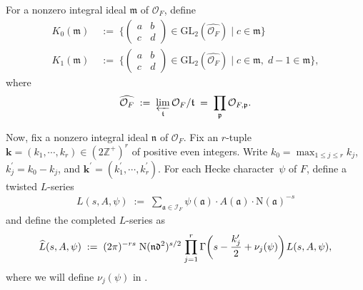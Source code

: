 \documentclass[11pt]{amsart}
\theoremstyle{remark}
\newcommand\m[1]{\begin{pmatrix}#1\end{pmatrix}}
\newcommand\mbf[1]{\mathbf{#1}}
\newcommand\cl[1]{\mathcal{#1}}
\newcommand\fr[1]{\mathfrak{#1}}
\newcommand\wh[1]{\widehat{#1}}
\newcommand{\inte}{\mathbb{Z}}
\newcommand{\clo}{\mathcal{O}}
\newcommand{\eq}{\;=\;}
\newcommand{\deq}{\;:=\;}
\def\thin{{\hskip 1pt}}
\newcommand{\N}{\mathrm{N}}
\newcommand{\GL}{\mathrm{GL}}
\begin{document}
For a nonzero integral ideal $\fr{m}$ of $\clo_F$, define
\begin{align*}
    K_0(\fr{m})&\deq\bigg\{\m{a&b\\c&d}\in\GL_2(\wh{\clo_F})\;\bigg|\;c\in\fr{m}\bigg\} \\
    K_1(\fr{m})&\deq\bigg\{\m{a&b\\c&d}\in\GL_2(\wh{\clo_F})\;\bigg|\;c\in\fr{m},\;d-1\in\fr{m}\bigg\},
\end{align*}
where
\begin{align*}
    \wh{\clo_F}\deq\varprojlim_{\fr{t}}\clo_F/\fr{t}\eq\prod_{\fr{p}}\clo_{F,\fr{p}}.
\end{align*}

Now, fix a nonzero integral ideal $\fr{n}$ of $\clo_F$. Fix an $r$-tuple $\mbf{k}=(k_1,\cdots,k_r)\in(2\inte^+)^r$ of positive even integers. Write $k_0=\max_{1\leq j\leq r}k_j$, $k_j^\prime=k_0-k_j$, and $\mbf{k}^\prime=(k_1^\prime,\cdots,k_r^\prime)$. For each Hecke character~$\psi$ of $F$, define a twisted $L$-series
\begin{align*}
L(s,A,\psi)\deq\sum_{\fr{a}\in\cl{I}_F}\psi(\fr{a})\cdot A(\fr{a})\cdot \N(\fr{a})^{-s}
\end{align*}
and define the completed $L$-series as
\begin{align*}
    \wh{L}(s,A,\psi)\deq(2\pi)^{-rs}\; \N(\fr{n}\fr{d}^2)^{s/2}\thin\prod_{j=1}^r\Gamma\bigg(s-\frac{k_j^\prime}{2}+\nu_j(\psi)\bigg)\thin L(s,A,\psi),
\end{align*}
where we will define $\nu_j(\psi)$ in .
\end{document}
